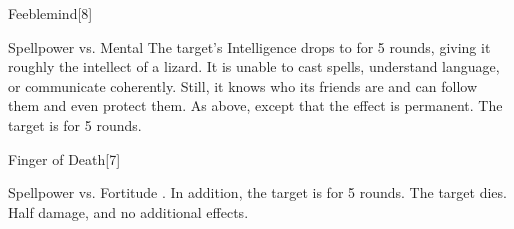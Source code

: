 \begin{spellsection}{Feeblemind}[8]
    \begin{spellheader}
    \end{spellheader}
    \begin{spellcontent}
        \begin{spelltargetinginfo}
        \end{spelltargetinginfo}
        \begin{spelleffects}
            \begin{spellattack}{Spellpower vs. Mental}
                \spellsuccess The target's Intelligence drops to  for 5 rounds, giving it roughly the intellect of a lizard. It is unable to cast spells, understand language, or communicate coherently. Still, it knows who its friends are and can follow them and even protect them.
                \spellcritical As above, except that the effect is permanent.
                \spellfailure The target is \dazed for 5 rounds.
            \end{spellattack}
        \end{spelleffects}
    \end{spellcontent}
    \begin{spellfooter}
        \miscastrandom
    \end{spellfooter}
\end{spellsection}

\begin{spellsection}{Finger of Death}[7]
    \begin{spellheader}
    \end{spellheader}
    \begin{spellcontent}
        \begin{spelltargetinginfo}
        \end{spelltargetinginfo}
        \begin{spelleffects}
            \begin{spellattack}{Spellpower vs. Fortitude}
                \spellsuccess {}. In addition, the target is \staggered for 5 rounds.
                \spellcritical The target dies.
                \spellfailure Half damage, and no additional effects.
            \end{spellattack}
        \end{spelleffects}
    \end{spellcontent}
    \begin{spellfooter}
        \miscastrandom
    \end{spellfooter}
\end{spellsection}

